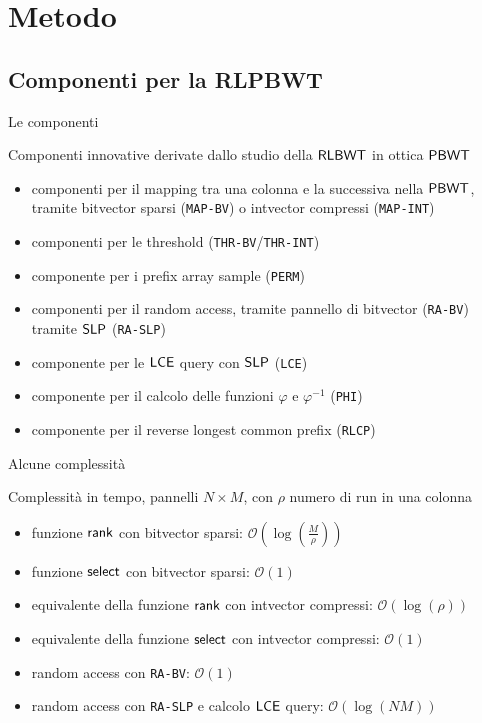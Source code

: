 \documentclass[]{beamer}
\def\SLP{\mbox{\rm {\sf SLP}}}
\def\rank{\mbox{\rm {\sf rank}}}
\def\LCE{\mbox{\rm {\sf LCE}}}
\def\select{\mbox{\rm {\sf select}}}
\def\RLBWT{\mbox{\rm {\sf RLBWT}}}
\def\PBWT{\mbox{\rm {\sf PBWT}}}
\def\LCE{\mbox{\rm {\sf LCE}}}
\begin{document}
\section{Metodo}
\subsection{Componenti per la RLPBWT}
\begin{frame}{Le componenti}
  \begin{block}{Componenti innovative derivate dallo studio della $\RLBWT$ in
      ottica $\PBWT$} 
    \begin{itemize}
      \item componenti per il mapping tra una colonna e la successiva nella
      $\PBWT$, tramite bitvector sparsi (\texttt{MAP-BV}) o intvector compressi
      (\texttt{MAP-INT})
      \item componenti per le threshold (\texttt{THR-BV}/\texttt{THR-INT})
      \item componente per i prefix array sample (\texttt{PERM})
      \item componenti per il random access, tramite pannello di bitvector
      (\texttt{RA-BV}) tramite $\SLP$ (\texttt{RA-SLP})
      \item componente per le $\LCE$ query con $\SLP$ (\texttt{LCE})
      \item componente per il calcolo delle funzioni $\varphi$ e $\varphi^{-1}$
      (\texttt{PHI})
      \item componente per il reverse longest common prefix (\texttt{RLCP})
    \end{itemize}
  \end{block}
\end{frame}
\begin{frame}{Alcune complessità}
  \begin{block}{Complessità in tempo, pannelli $N\times M$, con $\rho$ numero di
    run in una colonna}
    \begin{itemize}
      \item funzione $\rank$ con bitvector sparsi:
      $\mathcal{O}\left(\log\left(\frac{M}{\rho}\right)\right)$
      \item funzione $\select$ con bitvector sparsi: $\mathcal{O}\left(1\right)$
      \item equivalente della funzione $\rank$ con intvector compressi:
      $\mathcal{O}\left(\log\left(\rho\right)\right)$
      \item equivalente della funzione $\select$ con intvector compressi:
      $\mathcal{O}\left(1\right)$ 
      \item random access con \texttt{RA-BV}: $\mathcal{O}(1)$
      \item random access con \texttt{RA-SLP} e calcolo $\LCE$ query:
      $\mathcal{O} (\log(NM))$
    \end{itemize}
  \end{block}
\end{frame}
\end{document}
